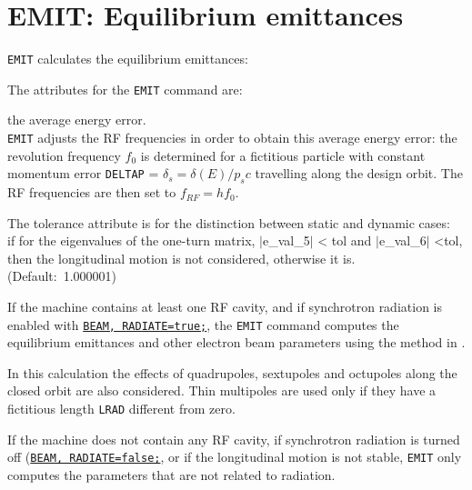 
\chapter{EMIT: Equilibrium emittances} 
\label{chap:emit}

\texttt{EMIT} calculates the equilibrium emittances: 

\vspace{5mm}

The attributes for the \texttt{EMIT} command are: 

\begin{madlist}
   the average energy error. \\
  {\tt EMIT} adjusts the RF frequencies in order to obtain this
  average energy error: the revolution frequency $f_0$
  is determined for a fictitious particle with constant momentum error  
  {\tt DELTAP} = $\delta_s = \delta(E) / p_s c$ travelling along the design
  orbit. The RF frequencies are then set to   
  $f_{RF} = h f_0$. 

   The tolerance attribute is for the distinction between
  static and dynamic cases: \\
  if for the eigenvalues of the one-turn matrix, $|$e\_val\_5$|$ \textless
  tol and $|$e\_val\_6$|$ \textless tol, then the longitudinal motion is
  not considered, otherwise it is. \\
  (Default:~1.000001)  
\end{madlist}


If the machine contains at least one RF cavity, and if synchrotron
radiation is enabled with \hyperref[sec:beam]{\tt BEAM, RADIATE=true;}, the
{\tt EMIT} command computes the equilibrium emittances and other
electron beam parameters using the method in \cite{chao1979}.

In this calculation the effects of quadrupoles, sextupoles and
octupoles along the closed orbit are also considered. Thin multipoles are
used only if they have a fictitious length {\tt LRAD} different from zero.  

If the machine does not contain any RF cavity, if synchrotron radiation is
turned off (\hyperref[sec:beam]{\tt BEAM, RADIATE=false;}, or if the longitudinal
motion is not stable, {\tt EMIT} only computes the parameters that
are not related to radiation.  

